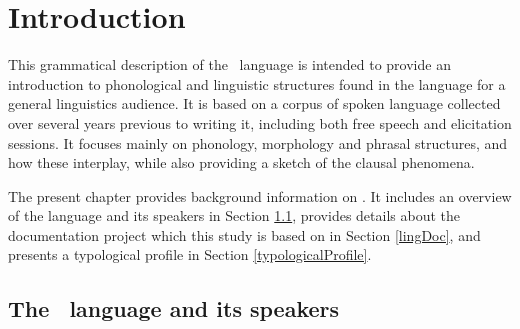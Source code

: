 


\chapter{Introduction}\label{introChapter}%

This grammatical description of the \PS\ language is intended to provide an introduction to phonological and linguistic structures found in the language for a general linguistics audience. It is based on a corpus of spoken language collected over several years previous to writing it, including both free speech and elicitation sessions. It focuses mainly on phonology, morphology and phrasal structures, and how these interplay, while also providing a sketch of the clausal phenomena. 

The present chapter provides background information on \PS. It includes an overview of the language and its speakers in Section \ref{PSbackground}, provides details about the documentation project which this study is based on in Section \ref{lingDoc}, and presents a typological profile in Section \ref{typologicalProfile}. 


\section{The \PS\ language and its speakers}\label{PSbackground}

